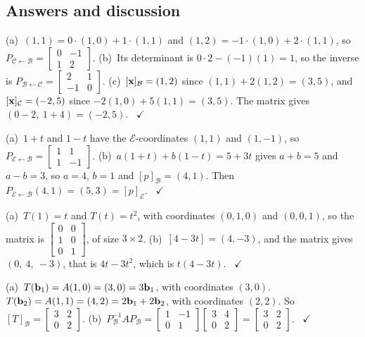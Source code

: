 \documentclass[11pt]{article}
\begin{document}
\subsection*{Answers and discussion}
\begin{description}[leftmargin=0pt,itemsep=5pt]
  \item[Knowledge Check \ref{kc:kcpb}.] (a)~$(1,1)=0\cdot(1,0)+1\cdot(1,1)$ and $(1,2)=-1\cdot(1,0)+2\cdot(1,1)$, so $P_{\mathcal{C}\leftarrow\mathcal{B}}=\begin{bmatrix}0&-1\\1&2\end{bmatrix}$. (b)~Its determinant is $0\cdot2-(-1)(1)=1$, so the inverse is $P_{\mathcal{B}\leftarrow\mathcal{C}}=\begin{bmatrix}2&1\\-1&0\end{bmatrix}$. (c)~$[\mathbf{x}]_{\mathcal{B}}=(1,2)$ since $(1,1)+2(1,2)=(3,5)$, and $[\mathbf{x}]_{\mathcal{C}}=(-2,5)$ since $-2(1,0)+5(1,1)=(3,5)$. The matrix gives $(0-2,\ 1+4)=(-2,5)$. \ $\checkmark$
  \item[Knowledge Check \ref{kc:kcpoly}.] (a)~$1+t$ and $1-t$ have the $\mathcal{E}$-coordinates $(1,1)$ and $(1,-1)$, so $P_{\mathcal{E}\leftarrow\mathcal{B}}=\begin{bmatrix}1&1\\1&-1\end{bmatrix}$. (b)~$a(1+t)+b(1-t)=5+3t$ gives $a+b=5$ and $a-b=3$, so $a=4$, $b=1$ and $[p]_{\mathcal{B}}=(4,1)$. Then $P_{\mathcal{E}\leftarrow\mathcal{B}}(4,1)=(5,3)=[p]_{\mathcal{E}}$. \ $\checkmark$
  \item[Knowledge Check \ref{kc:kcmat}.] (a)~$T(1)=t$ and $T(t)=t^2$, with coordinates $(0,1,0)$ and $(0,0,1)$, so the matrix is $\begin{bmatrix}0&0\\1&0\\0&1\end{bmatrix}$, of size $3\times2$. (b)~$[4-3t]=(4,-3)$, and the matrix gives $(0,\ 4,\ -3)$, that is $4t-3t^2$, which is $t(4-3t)$. \ $\checkmark$
  \item[Knowledge Check \ref{kc:kcbm}.] (a)~$T(\mathbf{b}_1)=A(1,0)=(3,0)=3\mathbf{b}_1$, with coordinates $(3,0)$. $T(\mathbf{b}_2)=A(1,1)=(4,2)=2\mathbf{b}_1+2\mathbf{b}_2$, with coordinates $(2,2)$. So $[T]_{\mathcal{B}}=\begin{bmatrix}3&2\\0&2\end{bmatrix}$. (b)~$P_{\mathcal{B}}^{-1}AP_{\mathcal{B}}=\begin{bmatrix}1&-1\\0&1\end{bmatrix}\begin{bmatrix}3&4\\0&2\end{bmatrix}=\begin{bmatrix}3&2\\0&2\end{bmatrix}$. \ $\checkmark$

\end{description}
\end{document}
